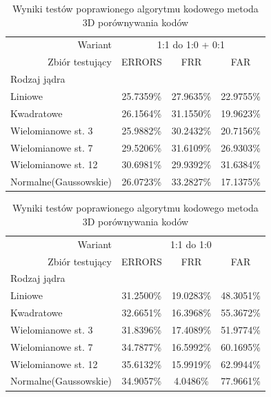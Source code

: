 \begin{table}[!htb]
    \begin{tabular}{p{3cm}|r||c|c|c|}
	\cline{2-5}
    & Wariant & \multicolumn{3}{|c|}{1:1 do 1:0 + 0:1}\\ \cline{2-5} 
    & Zbiór testujący & ERRORS  & FRR & FAR\\ \hline
	\multicolumn{2}{|l||}{Rodzaj jądra} &  \multicolumn{3}{|c|}{}\\
	\hline\hline
    \multicolumn{2}{|l||}{Liniowe} & 25.7359\% & 27.9635\% & 22.9755\%\\ \hline
    \multicolumn{2}{|l||}{Kwadratowe} & 26.1564\% & 31.1550\% & 19.9623\%\\ \hline
    \multicolumn{2}{|l||}{Wielomianowe st. 3} & 25.9882\% & 30.2432\% & 20.7156\%\\ \hline
    \multicolumn{2}{|l||}{Wielomianowe st. 7} & 29.5206\% & 31.6109\% & 26.9303\%\\ \hline
    \multicolumn{2}{|l||}{Wielomianowe st. 12} & 30.6981\% & 29.9392\% & 31.6384\%\\ \hline
    \multicolumn{2}{|l||}{Normalne(Gaussowskie)} & 26.0723\% & 33.2827\% & 17.1375\%\\ \hline
    \end{tabular}
	\caption{Wyniki testów poprawionego algorytmu kodowego metoda 3D porównywania kodów}
	\label{tab:3D_sum_21}
\end{table}

\begin{table}[!htb]
    \begin{tabular}{p{3cm}|r||c|c|c|}
	\cline{2-5}
    & Wariant & \multicolumn{3}{|c|}{1:1 do 1:0}\\ \cline{2-5} 
    & Zbiór testujący & ERRORS  & FRR & FAR\\ \hline
	\multicolumn{2}{|l||}{Rodzaj jądra} &  \multicolumn{3}{|c|}{}\\
	\hline\hline
    \multicolumn{2}{|l||}{Liniowe} & 31.2500\% & 19.0283\% & 48.3051\%\\ \hline
    \multicolumn{2}{|l||}{Kwadratowe} & 32.6651\% & 16.3968\% & 55.3672\%\\ \hline
    \multicolumn{2}{|l||}{Wielomianowe st. 3} & 31.8396\% & 17.4089\% & 51.9774\%\\ \hline
    \multicolumn{2}{|l||}{Wielomianowe st. 7} & 34.7877\% & 16.5992\% & 60.1695\%\\ \hline
    \multicolumn{2}{|l||}{Wielomianowe st. 12} & 35.6132\% & 15.9919\% & 62.9944\%\\ \hline
    \multicolumn{2}{|l||}{Normalne(Gaussowskie)} & 34.9057\% & 4.0486\% & 77.9661\%\\ \hline
    \end{tabular}
	\caption{Wyniki testów poprawionego algorytmu kodowego metoda 3D porównywania kodów}
	\label{tab:3D_sum_22}
\end{table}


